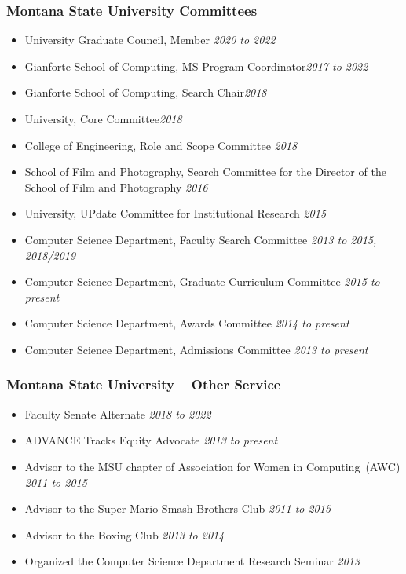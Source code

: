\subsubsection*{Montana State University Committees}
\begin{itemize}
    \item University Graduate Council, Member \hfill{\it 2020 to 2022}
    \item Gianforte School of Computing, MS Program Coordinator\hfill {\it 2017
    to 2022}
    \item Gianforte School of Computing, Search Chair\hfill {\it 2018}
    \item University, Core Committee\hfill {\it 2018}
    \item College of Engineering, Role and Scope Committee \hfill {\it 2018}
    \item School of Film and Photography, Search Committee for the Director of
    the School of Film and Photography \hfill {\it 2016}
    \item University, UPdate Committee for Institutional Research \hfill {\it
    2015}
    \item Computer Science Department, Faculty Search Committee \hfill {\it 2013
    to 2015, 2018/2019}
    \item Computer Science Department, Graduate Curriculum Committee \hfill {\it
    2015 to present}
    \item Computer Science Department, Awards Committee \hfill {\it 2014 to
    present}
    \item Computer Science Department, Admissions Committee \hfill {\it 2013 to
    present}
\end{itemize}

\subsubsection*{Montana State University -- Other Service}
\begin{itemize}
    \item Faculty Senate Alternate \hfill {\it 2018 to 2022}
    \item ADVANCE Tracks Equity Advocate \hfill {\it 2013 to present}
    \item Advisor to the MSU chapter of Association for Women in Computing~(AWC)
    \hfill {\it 2011 to 2015}
    \item Advisor to the Super Mario Smash Brothers Club \hfill {\it 2011 to
    2015}
    \item Advisor to the Boxing Club \hfill {\it 2013 to 2014}
    \item Organized the Computer Science Department Research Seminar \hfill {\it
    2013}
\end{itemize}

